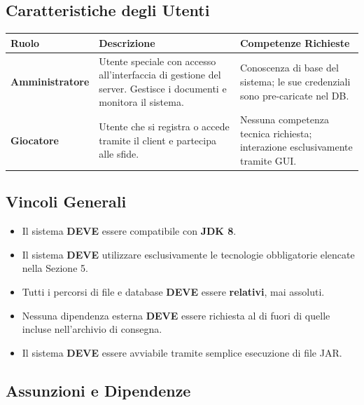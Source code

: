 \documentclass[12pt, a4paper]{article}
\newcommand{\mustshall}{\textbf{DEVE}}
\begin{document}
\subsection{Caratteristiche degli Utenti}

\begin{longtable}{|p{3cm}|p{5cm}|p{5.5cm}|}
    \hline
    \rowcolor{primaryBlue!20}
    \textbf{Ruolo} & \textbf{Descrizione} & \textbf{Competenze Richieste} \\
    \hline
    \endhead
    \textbf{Amministratore} &
    Utente speciale con accesso all'interfaccia di gestione del server. Gestisce i documenti e monitora il sistema. &
    Conoscenza di base del sistema; le sue credenziali sono pre-caricate nel DB. \\
    \hline
    \textbf{Giocatore} &
    Utente che si registra o accede tramite il client e partecipa alle sfide. &
    Nessuna competenza tecnica richiesta; interazione esclusivamente tramite GUI. \\
    \hline
\end{longtable}

\subsection{Vincoli Generali}

\begin{constraintbox}
\begin{itemize}[leftmargin=*]
    \item Il sistema \mustshall{} essere compatibile con \textbf{JDK 8}.
    \item Il sistema \mustshall{} utilizzare esclusivamente le tecnologie obbligatorie elencate nella Sezione 5.
    \item Tutti i percorsi di file e database \mustshall{} essere \textbf{relativi}, mai assoluti.
    \item Nessuna dipendenza esterna \mustshall{} essere richiesta al di fuori di quelle incluse nell'archivio di consegna.
    \item Il sistema \mustshall{} essere avviabile tramite semplice esecuzione di file JAR.
\end{itemize}
\end{constraintbox}

\subsection{Assunzioni e Dipendenze}
\end{document}
